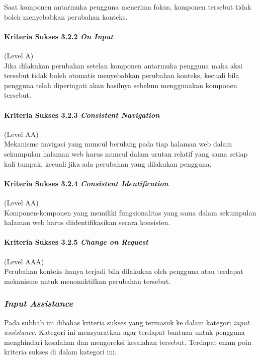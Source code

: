 Saat komponen antarmuka pengguna menerima fokus, komponen tersebut tidak boleh menyebabkan perubahan konteks.

\paragraph{Kriteria Sukses 3.2.2 \textit{On Input}}
\label{sec:kriteria_sukses_3.2.2}
(Level A)\\

Jika dilakukan perubahan setelan komponen antarmuka pengguna maka aksi tersebut tidak boleh otomatis menyebabkan perubahan konteks, kecuali bila pengguna telah diperingati akan hasilnya sebelum menggunakan komponen tersebut.

\paragraph{Kriteria Sukses 3.2.3 \textit{Consistent Navigation}}
\label{sec:kriteria_sukses_3.2.3}
(Level AA)\\

Mekanisme navigasi yang muncul berulang pada tiap halaman web dalam sekumpulan halaman web harus muncul dalam urutan relatif yang sama setiap kali tampak, kecuali jika ada perubahan yang dilakukan pengguna.

\paragraph{Kriteria Sukses 3.2.4 \textit{Consistent Identification}}
\label{sec:kriteria_sukses_3.2.4}
(Level AA)\\

Komponen-komponen yang memiliki fungsionalitas yang sama dalam sekumpulan halaman web harus diidentifikasikan secara konsisten.

\paragraph{Kriteria Sukses 3.2.5 \textit{Change on Request}}
\label{sec:kriteria_sukses_3.2.5}
(Level AAA)\\

Perubahan konteks hanya terjadi bila dilakukan oleh pengguna atau terdapat mekanisme untuk menonaktifkan perubahan tersebut.

\subsubsection{\textit{Input Assistance}}
\label{sec:input_assistance}
Pada subbab ini dibahas kriteria sukses yang termasuk ke dalam kategori \textit{input assistance}. Kategori ini mensyaratkan agar terdapat bantuan untuk pengguna menghindari kesalahan dan mengoreksi kesalahan tersebut. Terdapat enam poin kriteria sukses di dalam kategori ini.

